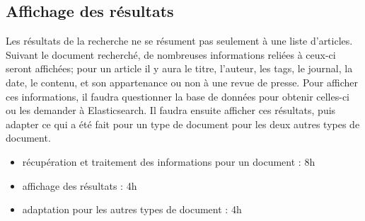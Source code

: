 	\subsection{Affichage des résultats} 
	\label{subsec:rech_result}
		Les résultats de la recherche ne se résument pas seulement à une liste d'articles. Suivant le document recherché, de nombreuses informations reliées à ceux-ci seront affichées; pour un article il y aura le titre, l'auteur, les tags, le journal, la date, le contenu, et son appartenance ou non à une revue de presse. Pour afficher ces informations, il faudra questionner la base de données pour obtenir celles-ci ou les demander à Elasticsearch. Il faudra ensuite afficher ces résultats, puis adapter ce qui a été fait pour un type de document pour les deux autres types de document.

		\begin{itemize}
			\item récupération et traitement des informations pour un document : 8h
			\item affichage des résultats : 4h
			\item adaptation pour les autres types de document : 4h
		\end{itemize}

